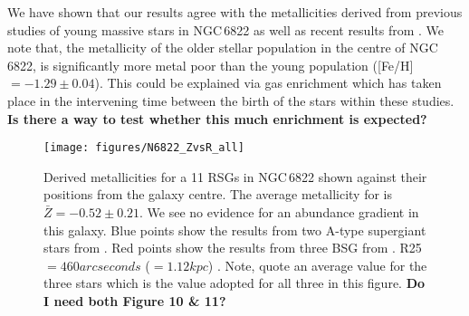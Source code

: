\documentclass[manuscript]{aastex}
\begin{document}
We have shown that our results agree with the metallicities derived from previous studies of young massive stars in NGC\,6822 as well as recent results from
\cite{2012A&A...540A.135S}.
We note that,
the metallicity of the older stellar population in the centre of NGC\,6822,
is significantly more metal poor than the young population
([Fe/H]$ = -1.29 \pm 0.04$).
This could be explained via gas enrichment which has taken place in the intervening time between the birth of the stars within these studies.
\textbf{Is there a way to test whether this much enrichment is expected?}



\begin{figure}
\texttt{[image: figures/N6822\_ZvsR\_all]}
\caption{
Derived metallicities for a 11 RSGs in NGC\,6822 shown against their positions from the galaxy centre.
The average metallicity for is
$\bar{Z} = -0.52\pm 0.21$.
We see no evidence for an abundance gradient in this galaxy.
Blue points show the results from two A-type supergiant stars from
\protect\cite{2001ApJ...547..765V}.
Red points show the results from three BSG from
\protect\cite{1999A&A...352L..40M}.
R25 $= 460 arcseconds$ ($=1.12kpc$)
\citep{2012AJ....144....4M}.
Note,
\citep{2012AJ....144....4M} quote an average value for the three stars which is the value adopted for all three in this figure.
\textbf{Do I need both Figure 10 \& 11?}
        }
\label{fig:ZvsR_BSG}
\end{figure}
\end{document}
